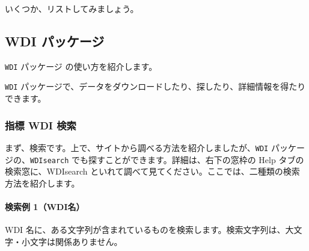 \documentclass[
]{bxjsbook}
\theoremstyle{definition}
\theoremstyle{definition}
\theoremstyle{definition}
\theoremstyle{definition}
\theoremstyle{remark}
\begin{document}
いくつか、リストしてみましょう。

\hypertarget{wdi-ux30d1ux30c3ux30b1ux30fcux30b8}{%
\subsection{WDI パッケージ}\label{wdi-ux30d1ux30c3ux30b1ux30fcux30b8}}

\texttt{WDI} パッケージ の使い方を紹介します。

\texttt{WDI} パッケージで、データをダウンロードしたり、探したり、詳細情報を得たりできます。

\hypertarget{ux6307ux6a19-wdi-ux691cux7d22}{%
\subsubsection{指標 WDI 検索}\label{ux6307ux6a19-wdi-ux691cux7d22}}

まず、検索です。上で、サイトから調べる方法を紹介しましたが、\texttt{WDI} パッケージの、\texttt{WDIsearch} でも探すことができます。詳細は、右下の窓枠の Help タブの検索窓に、WDIsearch といれて調べて見てください。ここでは、二種類の検索方法を紹介します。

\hypertarget{ux691cux7d22ux4f8b-1wdiux540d}{%
\paragraph{検索例 1（WDI名）}\label{ux691cux7d22ux4f8b-1wdiux540d}}

WDI 名に、ある文字列が含まれているものを検索します。検索文字列は、大文字・小文字は関係ありません。
\end{document}
